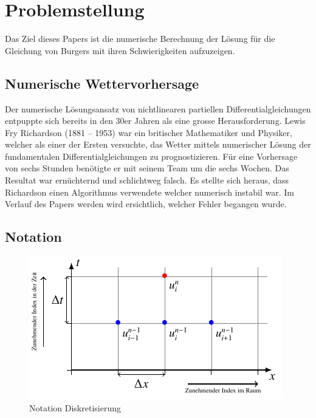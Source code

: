 %
%
\section{Problemstellung
\label{burgers:section:problemstellung}}

	Das Ziel dieses Papers ist die numerische Berechnung der Lösung für die Gleichung von Burgers mit ihren Schwierigkeiten aufzuzeigen.



	\subsection{Numerische Wettervorhersage}
	\label{burgers:sec:nwp}

	Der numerische L\"osungsansatz von nichtlinearen partiellen Differentialgleichungen entpuppte sich bereits in den 30er Jahren als eine grosse Herausforderung.
	Lewis Fry Richardson (1881 -- 1953) war ein britischer Mathematiker und Physiker, welcher als einer der Ersten versuchte, das Wetter mittels numerischer Lösung der fundamentalen Differentialgleichungen zu prognostizieren.
	F\"ur eine Vorhersage von sechs Stunden ben\"otigte er mit seinem Team um die sechs Wochen.
	Das Resultat war ern\"uchternd und schlichtweg falsch.
	Es stellte sich heraus, dass Richardson einen Algorithmus verwendete welcher numerisch instabil war.
	Im Verlauf des Papers werden wird ersichtlich, welcher Fehler begangen wurde.

	\subsection{Notation}

     \begin{figure}
       \centering
       \includegraphics[width=.8\textwidth]{papers/burgers/BurgersEquation/tikz/Gitter/gitter.pdf}
       \caption{Notation Diskretisierung}
       \label{burgers:fig:Disk}
     \end{figure}


